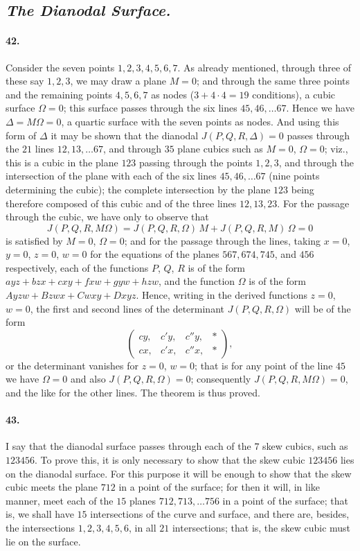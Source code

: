 \documentclass[11pt,a4paper]{article}
\begin{document}
\subsection*{\textit{The Dianodal Surface.}}

\paragraph{42.}
Consider the seven points $1, 2, 3, 4, 5, 6, 7$. As already mentioned, through three of
these say $1, 2, 3$, we may draw a plane $M = 0$; and through the same three points and
the remaining points $4, 5, 6, 7$ as nodes ($3 + 4 \cdot 4 = 19$ conditions), a cubic
surface $\Omega = 0$; this surface passes through the six lines $45, 46, \ldots 67$. Hence
we have $\Delta = M \Omega = 0$, a quartic surface with the seven points as nodes. And
using this form of $\Delta$ it may be shown that the dianodal $J(P, Q, R, \Delta) = 0$
passes through the $21$ lines $12, 13, \ldots 67$, and through $35$ plane cubics such as
$M = 0$, $\Omega = 0$; viz., this is a cubic in the plane $123$ passing through the points
$1, 2, 3$, and through the intersection of the plane with each of the six lines $45, 46,
\ldots 67$ (nine points determining the cubic); the complete intersection by the plane
$123$ being therefore composed of this cubic and of the three lines $12, 13, 23$. For the
passage through the cubic, we have only to observe that
\[
J(P, Q, R, M \Omega) = J(P, Q, R, \Omega)\,M + J(P, Q, R, M)\,\Omega = 0
\]
is satisfied by $M = 0$, $\Omega = 0$; and for the passage through the lines, taking
$x = 0$, $y = 0$, $z = 0$, $w = 0$ for the equations of the planes $567, 674, 745$, and
$456$ respectively, each of the functions $P$, $Q$, $R$ is of the form
$ayz + bzx + cxy + fxw + gyw + hzw$, and the function $\Omega$ is of the form
$Ayzw + Bzwx + Cwxy + Dxyz$. Hence, writing in the derived functions $z = 0$, $w = 0$, the
first and second lines of the determinant $J(P, Q, R, \Omega)$ will be of the form
\[
\begin{pmatrix}
c y, & c' y, & c'' y, & * \\
c x, & c' x, & c'' x, & *
\end{pmatrix},
\]
or the determinant vanishes for $z = 0$, $w = 0$; that is for any point of the line $45$
we have $\Omega = 0$ and also $J(P, Q, R, \Omega) = 0$; consequently $J(P, Q, R, M \Omega) = 0$,
and the like for the other lines. The theorem is thus proved.

\paragraph{43.}
I say that the dianodal surface passes through each of the $7$ skew cubics, such as $123456$.
To prove this, it is only necessary to show that the skew cubic $123456$ lies on the
dianodal surface. For this purpose it will be enough to show that the skew cubic meets the
plane $712$ in a point of the surface; for then it will, in like manner, meet each of the
$15$ planes $712, 713, \ldots 756$ in a point of the surface; that is, we shall have $15$
intersections of the curve and surface, and there are, besides, the intersections
$1, 2, 3, 4, 5, 6$, in all $21$ intersections; that is, the skew cubic must lie on the
surface.
\end{document}
